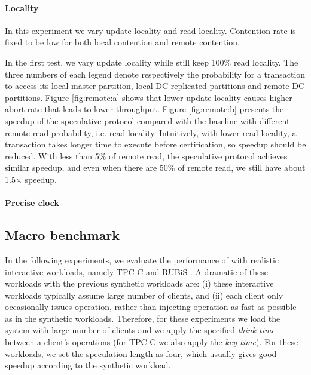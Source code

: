 \paragraph{Locality} In this experiment we vary update locality and read locality. Contention rate is fixed to be low for both local contention and remote contention.

In the first test, we vary update locality while still keep 100\% read locality. The three numbers of each legend denote respectively the probability for a transaction to access its local master partition, local DC replicated partitions and remote DC partitions. Figure \ref{fig:remote:a} shows that lower update locality causes higher abort rate that leads to lower throughput. Figure \ref{fig:remote:b} presents the speedup of the speculative protocol compared with the baseline with different remote read probability, i.e. read locality. Intuitively, with lower read locality, a transaction takes longer time to execute before certification, so speedup should be reduced. With less than 5\% of remote read, the speculative protocol achieves similar speedup, and even when there are 50\% of remote read, we still have about 1.5$\times$ speedup.

\fi

\paragraph{Precise clock} 



\subsection{Macro benchmark}
In the following experiments, we evaluate the performance of \specula with realistic interactive workloads, namely TPC-C\cite{tpcc} and RUBiS \cite{rubis}. A dramatic of these workloads with the previous synthetic workloads are: (i) these interactive workloads typically assume large number of clients, and (ii) each client only occasionally issues operation, rather than injecting operation as fast as possible as in the synthetic workloads. Therefore, for these experiments we load the system with large number of clients and we apply the specified \textit{think time} between a client's operations (for TPC-C we also apply the \textit{key time}). For these workloads, we set the speculation length as four, which usually gives good speedup according to the synthetic workload.



